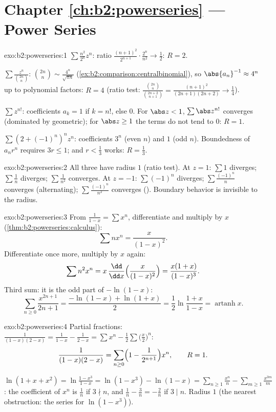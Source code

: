 \section*{Chapter \ref{ch:b2:powerseries} --- Power Series}

\begin{solution}{exo:b2:powerseries:1}
$\sum \frac{n^2}{2^n}z^n$: ratio $\frac{(n+1)^2}{2^{n+1}}\cdot
\frac{2^n}{n^2} \to \frac12$: $R = 2$.

$\sum \frac{z^n}{\binom{2n}{n}}$: $\binom{2n}{n} \sim
\frac{4^n}{\sqrt{\pi n}}$ (\cref{ex:b2:comparison:centralbinomial}),
so $\abs{a_n}^{-1} \approx 4^n$ up to polynomial factors: $R = 4$
(ratio test: $\frac{\binom{2n}{n}}{\binom{2n+2}{n+1}} =
\frac{(n+1)^2}{(2n+1)(2n+2)} \to \frac14$).

$\sum z^{n!}$: coefficients $a_k = 1$ if $k = n!$, else $0$. For
$\abs z < 1$, $\sum \abs z^{n!}$ converges (dominated by geometric);
for $\abs z \geq 1$ the terms do not tend to $0$: $R = 1$.

$\sum (2 + (-1)^n)^n z^n$: coefficients $3^n$ (even $n$) and $1$
(odd $n$). Boundedness of $a_nr^n$ requires $3r \leq 1$; and $r <
\frac13$ works: $R = \frac13$.
\end{solution}

\begin{solution}{exo:b2:powerseries:2}
All three have radius $1$ (ratio test). At $z = 1$: $\sum 1$
diverges; $\sum\frac1n$ diverges; $\sum\frac{1}{n^2}$ converges. At
$z = -1$: $\sum(-1)^n$ diverges; $\sum\frac{(-1)^n}{n}$ converges
(alternating); $\sum\frac{(-1)^n}{n^2}$ converges ().
Boundary behavior is invisible to the radius.
\end{solution}

\begin{solution}{exo:b2:powerseries:3}
From $\frac{1}{1-x} = \sum x^n$, differentiate and multiply by $x$
(\cref{thm:b2:powerseries:calculus}):
\[
\sum n x^n = \frac{x}{(1-x)^2} .
\]
Differentiate once more, multiply by $x$ again:
\[
\sum n^2 x^n = x\,\frac{\dd}{\dd x}\Bigl(\frac{x}{(1-x)^2}\Bigr)
= \frac{x(1 + x)}{(1-x)^3} .
\]
Third sum: it is the odd part of $-\ln(1 - x)$:
\[
\sum_{n\geq0} \frac{x^{2n+1}}{2n+1}
= \frac{-\ln(1-x) + \ln(1+x)}{2}
= \frac12 \ln\frac{1+x}{1-x}
= \operatorname{artanh} x .
\]
\end{solution}

\begin{solution}{exo:b2:powerseries:4}
Partial fractions: $\frac{1}{(1-x)(2-x)} = \frac{1}{1-x} -
\frac{1}{2 - x} = \sum x^n - \frac12\sum \bigl(\frac x2\bigr)^n$:
\[
\frac{1}{(1-x)(2-x)} = \sum_{n\geq0} \Bigl(1 -
\frac{1}{2^{n+1}}\Bigr)x^n,
\qquad R = 1 .
\]

$\ln(1 + x + x^2) = \ln\frac{1 - x^3}{1 - x} = \ln(1 - x^3) -
\ln(1 - x) = \sum_{n\geq1}\frac{x^n}{n} -
\sum_{m\geq1}\frac{x^{3m}}{m}$: the coefficient of $x^n$ is
$\frac1n$ if $3 \nmid n$, and $\frac1n - \frac{3}{n} = -\frac2n$ if
$3 \mid n$. Radius $1$ (the nearest obstruction: the series for
$\ln(1-x^3)$).
\end{solution}

